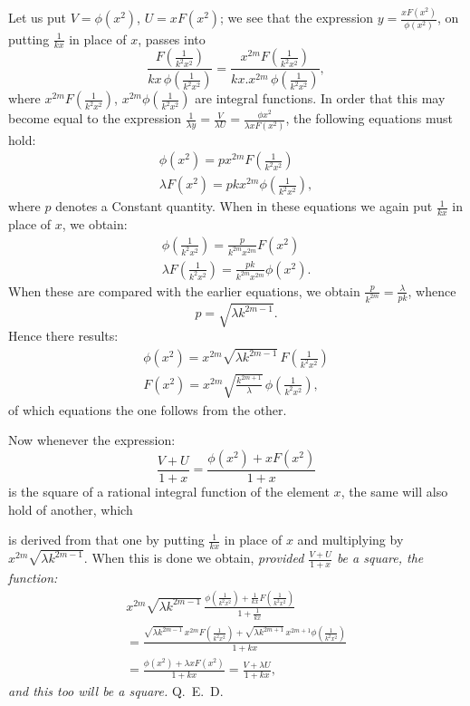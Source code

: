 \documentclass{article}
\begin{document}
Let us put $V=\phi(x^{2})$, $U=xF(x^{2})$; we see that the expression $y=\frac{xF(x^{2})}{\phi(x^{2})}$, on putting $\frac{1}{kx}$ in place of $x$, passes into
\[
\frac{F\left(\frac{1}{k^{2}x^{2}}\right)}{kx\,\phi\left(\frac{1}{k^{2}x^{2}}\right)}=\frac{x^{2m}F\left(\frac{1}{k^{2}x^{2}}\right)}{kx.x^{2m}\,\phi\left(\frac{1}{k^{2}x^{2}}\right)},
\]
where $x^{2m}F\left(\frac{1}{k^{2}x^{2}}\right)$, $x^{2m}\phi\left(\frac{1}{k^{2}x^{2}}\right)$ are integral functions. In order that this may become equal to the expression $\frac{1}{\lambda y}=\frac{V}{\lambda U}=\frac{\phi x^{2}}{\lambda xF(x^{2})}$, the following equations must hold:
\[
\begin{gathered}
\phi(x^{2})=px^{2m}F\left(\frac{1}{k^{2}x^{2}}\right)\\
\lambda F(x^{2})=pkx^{2m}\phi\left(\frac{1}{k^{2}x^{2}}\right),
\end{gathered}
\]
where $p$ denotes a Constant quantity. When in these equations we again put $\frac{1}{kx}$ in place of $x$, we obtain:
\[
\begin{gathered}
\phi\left(\frac{1}{k^{2}x^{2}}\right)=\frac{p}{k^{2m}x^{2m}}F(x^{2})\\
\lambda F\left(\frac{1}{k^{2}x^{2}}\right)=\frac{pk}{k^{2m}x^{2m}}\phi(x^{2}).
\end{gathered}
\]
When these are compared with the earlier equations, we obtain $\frac{p}{k^{2m}}=\frac{\lambda}{pk}$, whence
\[
p=\sqrt{\lambda k^{2m-1}}.
\]
Hence there results:
\[
\begin{gathered}
\phi(x^{2})=x^{2m}\sqrt{\lambda k^{2m-1}}\,F\left(\frac{1}{k^{2}x^{2}}\right)\\
F(x^{2})=x^{2m}\sqrt{\frac{k^{2m+1}}{\lambda}}\,\phi\left(\frac{1}{k^{2}x^{2}}\right),
\end{gathered}
\]
of which equations the one follows from the other.

Now whenever the expression:
\[
\frac{V+U}{1+x}=\frac{\phi(x^{2})+xF(x^{2})}{1+x}
\]
is the square of a rational integral function of the element $x$, the same will also hold of another, which

is derived from that one by putting $\frac{1}{kx}$ in place of $x$ and multiplying by $x^{2m}\sqrt{\lambda k^{2m-1}}$. When this is done we obtain, \emph{provided $\frac{V+U}{1+x}$ be a square, the function:}
\[
\begin{gathered}
x^{2m}\sqrt{\lambda k^{2m-1}}\,\frac{\phi\left(\frac{1}{k^{2}x^{2}}\right)+\frac{1}{kx}F\left(\frac{1}{k^{2}x^{2}}\right)}{1+\frac{1}{kx}}\\
=\frac{\sqrt{\lambda k^{2m-1}}\,x^{2m}F\left(\frac{1}{k^{2}x^{2}}\right)+\sqrt{\lambda k^{2m+1}}\,x^{2m+1}\phi\left(\frac{1}{k^{2}x^{2}}\right)}{1+kx}\\
=\frac{\phi(x^{2})+\lambda xF(x^{2})}{1+kx}=\frac{V+\lambda U}{1+kx},
\end{gathered}
\]
\emph{and this too will be a square.} Q.\ E.\ D.
\end{document}
